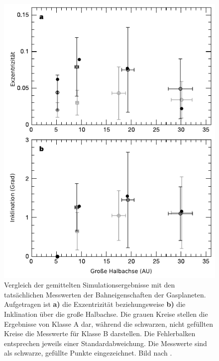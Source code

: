 \documentclass[12pt,a4paper,twoside,open=right,bibliography=totoc]{scrbook}
\renewcommand{\cite}{ \citep}
\begin{document}
\begin{figure}[tbn]
\centering
\includegraphics[scale=1]{img/Tsiganis2005-2.pdf}
\caption{Vergleich der gemittelten Simulationsergebnisse mit den tatsächlichen Messwerten der Bahneigenschaften der Gasplaneten. Aufgetragen ist \textbf{a)} die Exzentrizität beziehungsweise \textbf{b)} die Inklination über die große Halbachse. Die grauen Kreise stellen die Ergebnisse von Klasse A dar, während die schwarzen, nicht gefüllten Kreise die Messwerte für Klasse B darstellen. Die Fehlerbalken entsprechen jeweils einer Standardabweichung. Die Messwerte sind als schwarze, gefüllte Punkte eingezeichnet. Bild nach \cite{Tsiganis2005}.}
\label{fig:VergleichmitMesswerten}
\end{figure}
\end{document}
